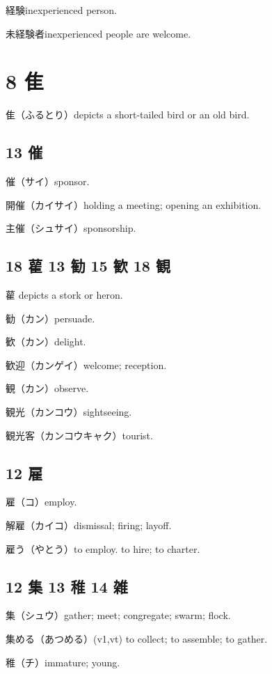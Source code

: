 経験inexperienced person.

未経験者inexperienced people are welcome.

\section{8 隹}

隹（ふるとり）depicts a short-tailed bird or an old bird.

\subsection{13 催}

催（サイ）sponsor.

開催（カイサイ）holding a meeting; opening an exhibition.

主催（シュサイ）sponsorship.

\subsection{18 雚 13 勧 15 歓 18 観}

雚 depicts a stork or heron.

勧（カン）persuade.

歓（カン）delight.

歓迎（カンゲイ）welcome; reception.

観（カン）observe.

観光（カンコウ）sightseeing.

観光客（カンコウキャク）tourist.

\subsection{12 雇}

雇（コ）employ.

解雇（カイコ）dismissal; firing; layoff.

雇う（やとう）to employ. to hire; to charter.

\subsection{12 集 13 稚 14 雑}

集（シュウ）gather; meet; congregate; swarm; flock.

集める（あつめる）(v1,vt) to collect; to assemble; to gather.

稚（チ）immature; young.

